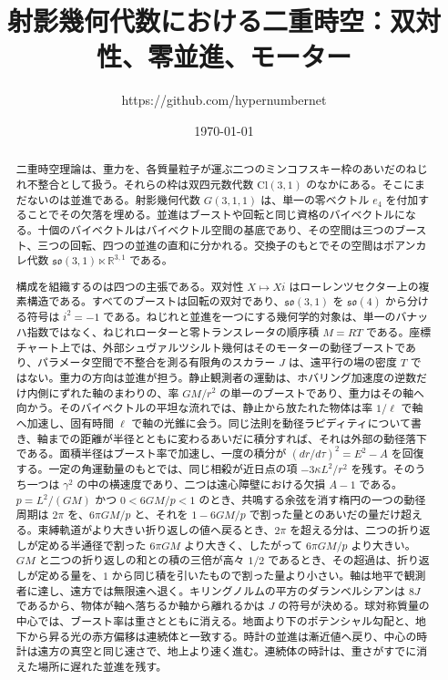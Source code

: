\documentclass[a4paper]{article}
\title{射影幾何代数における二重時空：双対性、零並進、モーター}
\author{https://github.com/hypernumbernet}
\date{\today}
\begin{document}
\maketitle

\begin{abstract}
二重時空理論は、重力を、各質量粒子が運ぶ二つのミンコフスキー枠のあいだのねじれ不整合として扱う。それらの枠は双四元数代数 \(\mathrm{Cl}(3,1)\) のなかにある。そこにまだないのは並進である。射影幾何代数 \(G(3,1,1)\) は、単一の零ベクトル \(e_{4}\) を付加することでその欠落を埋める。並進はブーストや回転と同じ資格のバイベクトルになる。十個のバイベクトルはバイベクトル空間の基底であり、その空間は三つのブースト、三つの回転、四つの並進の直和に分かれる。交換子のもとでその空間はポアンカレ代数 \(\mathfrak{so}(3,1)\ltimes\mathbb{R}^{3,1}\) である。

構成を組織するのは四つの主張である。双対性 \(X\mapsto Xi\) はローレンツセクター上の複素構造である。すべてのブーストは回転の双対であり、\(\mathfrak{so}(3,1)\) を \(\mathfrak{so}(4)\) から分ける符号は \(i^{2}=-1\) である。ねじれと並進を一つにする幾何学的対象は、単一のバナッハ指数ではなく、ねじれローターと零トランスレータの順序積 \(M=RT\) である。座標チャート上では、外部シュヴァルツシルト幾何はそのモーターの動径ブーストであり、パラメータ空間で不整合を測る有限角のスカラー \(J\) は、遠平行の場の密度 \(T\) ではない。重力の方向は並進が担う。静止観測者の運動は、ホバリング加速度の逆数だけ内側にずれた軸のまわりの、率 \(GM/r^{2}\) の単一のブーストであり、重力はその軸へ向かう。そのバイベクトルの平坦な流れでは、静止から放たれた物体は率 \(1/\ell\) で軸へ加速し、固有時間 \(\ell\) で軸の光錐に会う。同じ法則を動径ラピディティについて書き、軸までの距離が半径とともに変わるあいだに積分すれば、それは外部の動径落下である。面積半径はブースト率で加速し、一度の積分が \((dr/d\tau)^{2}=E^{2}-A\) を回復する。一定の角運動量のもとでは、同じ相殺が近日点の項 \(-3\kappa L^{2}/r^{2}\) を残す。そのうち一つは \(\gamma^{2}\) の中の横速度であり、二つは遠心障壁における欠損 \(A-1\) である。\(p=L^{2}/(GM)\) かつ \(0<6GM/p<1\) のとき、共鳴する余弦を消す楕円の一つの動径周期は \(2\pi\) を、\(6\pi GM/p\) と、それを \(1-6GM/p\) で割った量とのあいだの量だけ超える。束縛軌道がより大きい折り返しの値へ戻るとき、\(2\pi\) を超える分は、二つの折り返しが定める半通径で割った \(6\pi GM\) より大きく、したがって \(6\pi GM/p\) より大きい。\(GM\) と二つの折り返しの和との積の三倍が高々 \(1/2\) であるとき、その超過は、折り返しが定める量を、\(1\) から同じ積を引いたもので割った量より小さい。軸は地平で観測者に達し、遠方では無限遠へ退く。キリングノルムの平方のダランベルシアンは \(8J\) であるから、物体が軸へ落ちるか軸から離れるかは \(J\) の符号が決める。球対称質量の中心では、ブースト率は重さとともに消える。地面より下のポテンシャル勾配と、地下から昇る光の赤方偏移は連続体と一致する。時計の並進は漸近値へ戻り、中心の時計は遠方の真空と同じ速さで、地上より速く進む。連続体の時計は、重さがすでに消えた場所に遅れた並進を残す。
\end{abstract}
\end{document}
